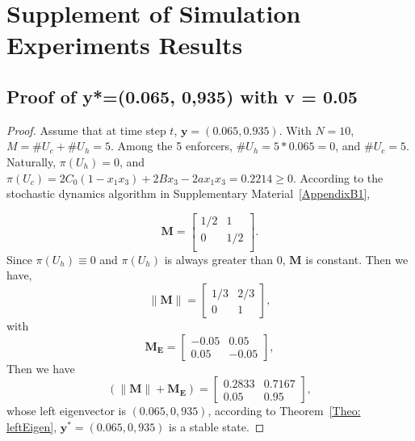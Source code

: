 \documentclass[letterpaper,10pt]{article}
\numberwithin{equation}{section}
\begin{document}
\section{Supplement of Simulation Experiments Results}\label{AppendixC}
\subsection{Proof of y*=(0.065, 0,935) with v = 0.05} \label{AppendixC1}
\begin{proof}
Assume that at time step $ t $, $ \mathbf{y} = (0.065, 0.935) $. 
With $ N = 10 $, $ M = \#U_c + \#U_h = 5 $. Among the 5 enforcers, $ \#U_h = 5*0.065 = 0 $, and $ \#U_c = 5 $. Naturally, $ \pi(U_{h}) = 0 $, and $ \pi(U_{c}) = 2C_{0}(1-x_{1}x_{3})+2Bx_{3}-2ax_{1}x_{3} = 0.2214 \geq 0 $. According to the stochastic dynamics algorithm in Supplementary Material~\ref{AppendixB1},

\begin{equation}
    \mathbf{M} = 
        \begin{bmatrix}
        1/2 & 1 \\
        0 & 1/2 \\
    \end{bmatrix}.
\end{equation}
Since $ \pi(U_h) \equiv 0 $ and $ \pi(U_h) $ is always greater than $ 0 $, $ \mathbf{M} $ is constant. Then we have,
\begin{equation}
    \lVert \mathbf{M} \rVert = 
        \begin{bmatrix}
        1/3 & 2/3 \\
        0 & 1
        \end{bmatrix},
\end{equation}
with
\begin{equation}
    \mathbf{M_{E}} = 
        \begin{bmatrix}
        -0.05 & 0.05 \\
        0.05 & -0.05
        \end{bmatrix},
\end{equation}
Then we have
\begin{equation}
    (\lVert \mathbf{M} \rVert+\mathbf{M_{E}}) = 
        \begin{bmatrix}
        0.2833 & 0.7167 \\
        0.05  & 0.95
        \end{bmatrix},
\end{equation}
whose left eigenvector is $ (0.065, 0,935) $, according to Theorem~\ref{Theo: leftEigen}, $ \mathbf{y}^* = (0.065, 0,935) $ is a stable state.
\end{proof}
\end{document}
